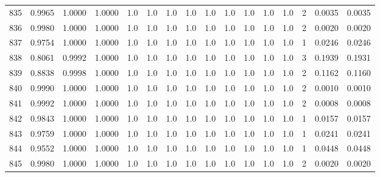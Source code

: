 \begin{tabular}{lrrrrrrrrrrrrrrr}
835 &      0.9965 &  1.0000 &  1.0000 &     1.0 &     1.0 &     1.0 &     1.0 &     1.0 &     1.0 &     1.0 &      1.0 &        1.0 &      2 &                    0.0035 &                     0.0035 \\
836 &      0.9980 &  1.0000 &  1.0000 &     1.0 &     1.0 &     1.0 &     1.0 &     1.0 &     1.0 &     1.0 &      1.0 &        1.0 &      2 &                    0.0020 &                     0.0020 \\
837 &      0.9754 &  1.0000 &  1.0000 &     1.0 &     1.0 &     1.0 &     1.0 &     1.0 &     1.0 &     1.0 &      1.0 &        1.0 &      1 &                    0.0246 &                     0.0246 \\
838 &      0.8061 &  0.9992 &  1.0000 &     1.0 &     1.0 &     1.0 &     1.0 &     1.0 &     1.0 &     1.0 &      1.0 &        1.0 &      3 &                    0.1939 &                     0.1931 \\
839 &      0.8838 &  0.9998 &  1.0000 &     1.0 &     1.0 &     1.0 &     1.0 &     1.0 &     1.0 &     1.0 &      1.0 &        1.0 &      2 &                    0.1162 &                     0.1160 \\
840 &      0.9990 &  1.0000 &  1.0000 &     1.0 &     1.0 &     1.0 &     1.0 &     1.0 &     1.0 &     1.0 &      1.0 &        1.0 &      2 &                    0.0010 &                     0.0010 \\
841 &      0.9992 &  1.0000 &  1.0000 &     1.0 &     1.0 &     1.0 &     1.0 &     1.0 &     1.0 &     1.0 &      1.0 &        1.0 &      2 &                    0.0008 &                     0.0008 \\
842 &      0.9843 &  1.0000 &  1.0000 &     1.0 &     1.0 &     1.0 &     1.0 &     1.0 &     1.0 &     1.0 &      1.0 &        1.0 &      1 &                    0.0157 &                     0.0157 \\
843 &      0.9759 &  1.0000 &  1.0000 &     1.0 &     1.0 &     1.0 &     1.0 &     1.0 &     1.0 &     1.0 &      1.0 &        1.0 &      1 &                    0.0241 &                     0.0241 \\
844 &      0.9552 &  1.0000 &  1.0000 &     1.0 &     1.0 &     1.0 &     1.0 &     1.0 &     1.0 &     1.0 &      1.0 &        1.0 &      1 &                    0.0448 &                     0.0448 \\
845 &      0.9980 &  1.0000 &  1.0000 &     1.0 &     1.0 &     1.0 &     1.0 &     1.0 &     1.0 &     1.0 &      1.0 &        1.0 &      2 &                    0.0020 &                     0.0020 \\

\end{tabular}
